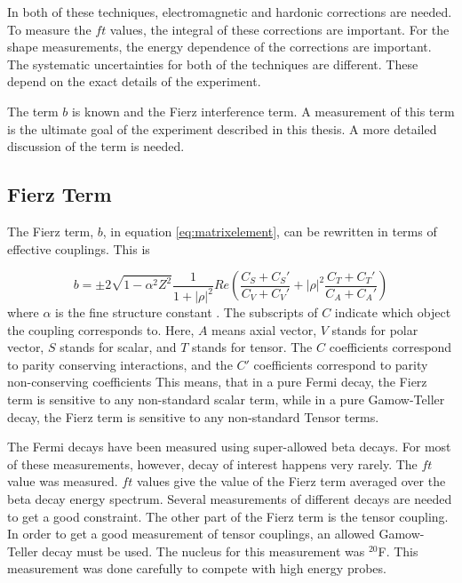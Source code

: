\documentclass[../MaxHughesThesis.tex]{subfiles}
\begin{document}
In both of these techniques, electromagnetic and hardonic corrections are needed.
To measure the $ft$ values, the integral of these corrections are important.
For the shape measurements, the energy dependence of the corrections are important.
The systematic uncertainties for both of the techniques are different.
These depend on the exact details of the experiment.

The term $b$ is known and the Fierz interference term.
A measurement of this term is the ultimate goal of the experiment described in this thesis.
A more detailed discussion of the term is needed.

\subsection{Fierz Term}
The Fierz term, $b$, in equation \ref{eq:matrixelement}, can be rewritten in terms of effective couplings.
This is %

\begin{equation}
	b =  \pm 2 \sqrt{1 - \alpha^{2}{Z^{2}}}\frac{1}{1 + |\rho|^{2}}Re(\frac{C_{S} + C_{S}'}{C_{V} + C_{V}'} + |\rho|^{2}\frac{C_{T} + C_{T}'}{C_{A} + C_{A}'})
	\label{eq:bwrittenout}
\end{equation}
where $\alpha$ is the fine structure constant \cite{Gon19}.
The subscripts of $C$ indicate which object the coupling corresponds to. 
Here, $A$ means axial vector, $V$ stands for polar vector, $S$ stands for scalar, and $T$ stands for tensor. 
The $C$ coefficients correspond to parity conserving interactions, and the $C'$ coefficients correspond to parity non-conserving coefficients \cite{Lee56}
This means, that in a pure Fermi decay, the Fierz term is sensitive to any non-standard scalar term, while in a pure Gamow-Teller decay, the Fierz term is sensitive to any non-standard Tensor terms. 

The Fermi decays have been measured using super-allowed beta decays.
For most of these measurements, however, decay of interest happens very rarely.
The $ft$ value was measured.
$ft$ values give the value of the Fierz term averaged over the beta decay energy spectrum.
Several measurements of different decays are needed to get a good constraint.
The other part of the Fierz term is the tensor coupling. 
In order to get a good measurement of  tensor couplings, an allowed Gamow-Teller decay must be used. 
The nucleus for this measurement was $^{20}$F.
This measurement was done carefully to compete with high energy probes.
\end{document}
